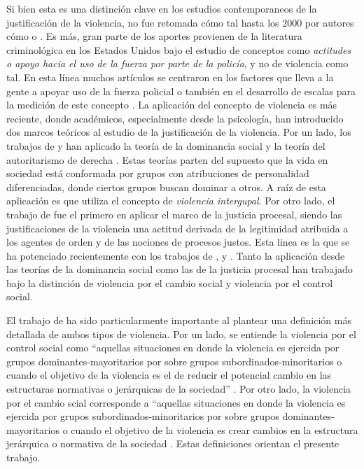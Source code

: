 \documentclass[12pt,twoside]{templates/facsothesis}
\begin{document}
Si bien esta es una distinción clave en los estudios contemporaneos de la justificación de la violencia, no fue retomada cómo tal hasta los 2000 por autores cómo \citet{Jackson2013} o \citet{Gerber2016}. Es más, gran parte de los aportes provienen de la literatura criminológica en los Estados Unidos bajo el estudio de conceptos como \emph{actitudes o apoyo hacia el uso de la fuerza por parte de la policía}, y no de violencia como tal. En esta línea muchos artículos se centraron en los factores que lleva a la gente a apoyar uso de la fuerza policial \citep{Gamson1970, Arthur1993, Arthur1994, Thompson2004, Perkins2006, Johnson2009} o también en el desarrollo de escalas para la medición de este concepto \citep{Barkan1998, Jefferis2011}. La aplicación del concepto de violencia es más reciente, donde académicos, especialmente desde la psicología, han introducido dos marcos teóricos al estudio de la justificación de la violencia. Por un lado, los trabajos de \citet{Henry2005} y \citet{Gerber2017b} han aplicado la teoría de la dominancia social \citep{Sidanius1999} y la teoría del autoritarismo de derecha \citep{Altemeyer1988}. Estas teorías parten del supuesto que la vida en sociedad está conformada por grupos con atribuciones de personalidad diferenciadas, donde ciertos grupos buscan dominar a otros. A raíz de esta aplicación es que utiliza el concepto de \emph{violencia intergupal}. Por otro lado, el trabajo de \citet{Jackson2013} fue el primero en aplicar el marco de la justicia procesal, siendo las justificaciones de la violencia una actitud derivada de la legitimidad atribuida a los agentes de orden y de las nociones de procesos justos. Esta linea es la que se ha potenciado recientemente con los trabajos de \citet{Gerber2017a}, \citet{Gerber2017b} y \citet{Bradford2017}. Tanto la aplicación desde las teorías de la dominancia social como las de la justicia procesal han trabajado bajo la distinción de violencia por el cambio social y violencia por el control social.

El trabajo de \citet{Gerber2017a} ha sido particularmente importante al plantear una definición más detallada de ambos tipos de violencia. Por un lado, se entiende la violencia por el control social como ``aquellas situaciones en donde la violencia es ejercida por grupos dominantes-mayoritarios por sobre grupos subordinados-minoritarios o cuando el objetivo de la violencia es el de reducir el potencial cambio en las estructuras normativas o jerárquicas de la sociedad'' \citep[ , pp.~3-4, traducción mía]{Gerber2017a}. Por otro lado, la violencia por el cambio scial corresponde a ``aquellas situaciones en donde la violencia es ejercida por grupos subordinados-minoritarios por sobre grupos dominantes-mayoritarios o cuando el objetivo de la violencia es crear cambios en la estructura jerárquica o normativa de la sociedad \citep[p.4, traducción mía]{Gerber2017a}. Estas definiciones orientan el presente trabajo.
\end{document}
